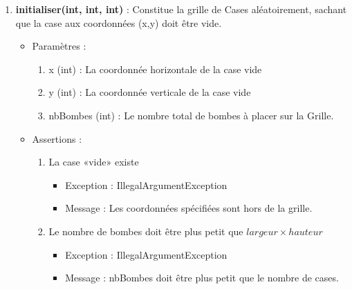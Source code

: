 \begin{itemize}
\begin{enumerate}
    \item {\bf initialiser(int, int, int) }: Constitue la grille de Cases aléatoirement, sachant que la case aux coordonnées (x,y) doit être vide.
      \begin{itemize}
      \item Paramètres : 
        \begin{enumerate}
        \item x (int) : La coordonnée horizontale de la case vide
        \item y (int) : La coordonnée verticale de la case vide
        \item nbBombes (int) : Le nombre total de bombes à placer sur la Grille.
        \end{enumerate}
      \item Assertions : 
        \begin{enumerate}
        \item La case «vide» existe
          \begin{itemize}
            \item Exception : IllegalArgumentException
          \item Message : Les coordonnées spécifiées sont hors de la grille.
          \end{itemize}
        \item Le nombre de bombes doit être plus petit que \break$largeur\times hauteur$
          \begin{itemize}
          \item Exception : IllegalArgumentException 
          \item Message : nbBombes doit être plus petit que le nombre de cases.
          \end{itemize}
        \end{enumerate}
      \end{itemize}
      

\end{enumerate}
\end{itemize}
